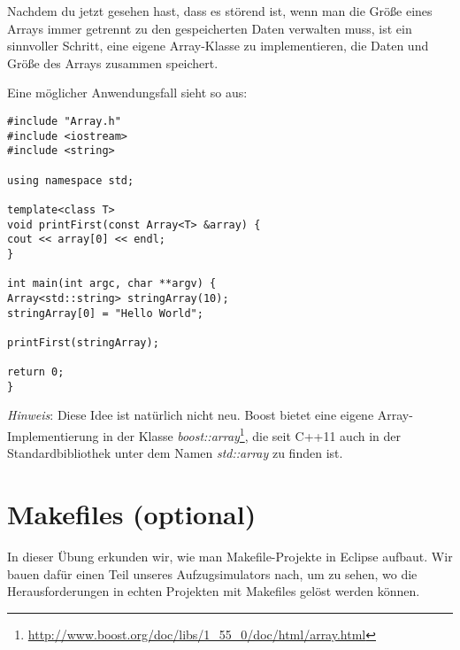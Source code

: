 Nachdem du jetzt gesehen hast, dass es störend ist, wenn man die Größe eines Arrays immer getrennt zu den gespeicherten Daten verwalten muss, ist ein sinnvoller Schritt, eine eigene Array-Klasse zu implementieren, die Daten und Größe des Arrays zusammen speichert.

Eine möglicher Anwendungsfall sieht so aus:

\begin{lstlisting}
#include "Array.h"
#include <iostream>
#include <string>

using namespace std;

template<class T>
void printFirst(const Array<T> &array) {
cout << array[0] << endl;
}

int main(int argc, char **argv) {
Array<std::string> stringArray(10);
stringArray[0] = "Hello World";

printFirst(stringArray);

return 0;
}
\end{lstlisting}

\emph{Hinweis}:
Diese Idee ist natürlich nicht neu.
Boost bietet eine eigene Array-Implementierung in der Klasse \emph{boost::array}\footnote{\url{http://www.boost.org/doc/libs/1_55_0/doc/html/array.html}}, die seit C++11 auch in der Standardbibliothek unter dem Namen \emph{std::array} zu finden ist.



\section{Makefiles (optional)}

In dieser Übung erkunden wir, wie man Makefile-Projekte in Eclipse aufbaut.
Wir bauen dafür einen Teil unseres Aufzugsimulators nach, um zu sehen, wo die Herausforderungen in echten Projekten mit Makefiles gelöst werden können.

